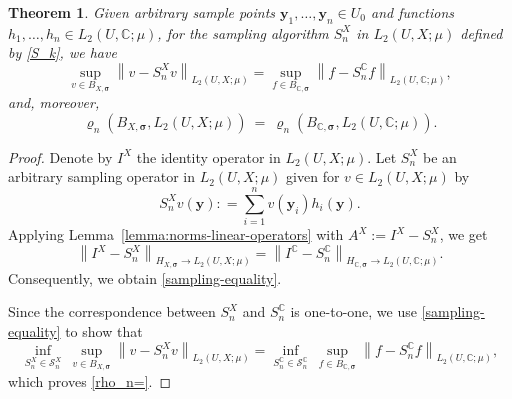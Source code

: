 \documentclass[11pt]{article}
\newtheorem{theorem}{Theorem}[section]
\numberwithin{equation}{section}
\theoremstyle{definition}
\theoremstyle{remark}
\newcommand{\norm}[2]{\left\|{#1}\right\|_{#2}}
\newcommand{\by}{{\boldsymbol{y}}}
\newcommand{\bsigma}{{\boldsymbol{\sigma}}}
\def\CC{{\mathbb C}}
\def\CC{{\mathbb C}}
\def\Ss{{\mathcal S}}
\def\CC{{\mathbb C}}
\begin{document}
\begin{theorem}\label{thm:sameleastsquares}
	Given arbitrary sample points $\by_1,\ldots,\by_n \in U_0$ and functions $h_1,\ldots,h_n \in L_2(U,\CC;\mu)$,	for the sampling algorithm $S_n^X$ in $L_2(U,X;\mu)$ defined by \eqref{S_k}, we have
	\begin{equation} \label{sampling-equality}
		\sup_{v \in B_{X,\bsigma}} \norm{v- S_n^X v}{L_2(U,X;\mu)}
		= \sup_{f \in B_{\CC,\bsigma}} \norm{f - S_n^\CC f}{L_2(U,\CC;\mu)},
	\end{equation}
    and, moreover,
		\begin{equation} \label{rho_n=}
		\varrho_n(B_{X,\bsigma}, L_2(U,X;\mu)) \ = \ \varrho_n(B_{\CC,\bsigma}, L_2(U,\CC;\mu)).
	\end{equation}
\end{theorem}

\begin{proof}
	Denote by $I^X$ the identity operator in $L_2(U,X;\mu)$. Let $S_n^X$ be an arbitrary sampling operator in $L_2(U,X;\mu)$ given for $v \in L_2(U,X;\mu)$ by
	\begin{equation*}
		S_n^X v(\by): = \sum_{i=1}^n v(\by_i) h_i(\by).
	\end{equation*}
    Applying Lemma~\ref{lemma:norms-linear-operators} with $A^X:= I^X - S_n^X$, we get
	\begin{equation*}
		\norm{I^X - S_n^X}{{H_{X,\bsigma}}\to L_2(U,X;\mu)}
		=
		\norm{I^\CC - S_n^\CC}{H_{\CC,\bsigma} \to L_2(U,\CC;\mu)}.
	\end{equation*}
	Consequently, we obtain \eqref{sampling-equality}.

	Since the correspondence between $S_n^X$ and $S_n^\CC$ is one-to-one, 
    we use \eqref{sampling-equality} to show that
	\begin{equation*}
		\inf_{S_n^X \in \Ss_n^X} \ \sup_{v \in B_{X,\bsigma}} \norm{v- S_n^X v}{L_2(U,X;\mu)}
		=
		\inf_{S_n^\CC \in \Ss_n^\CC} \ \sup_{f \in B_{\CC,\bsigma}} \norm{f - S_n^\CC f}{L_2(U,\CC;\mu)},
	\end{equation*}
	which proves \eqref{rho_n=}.
	\hfill
\end{proof}
\end{document}
